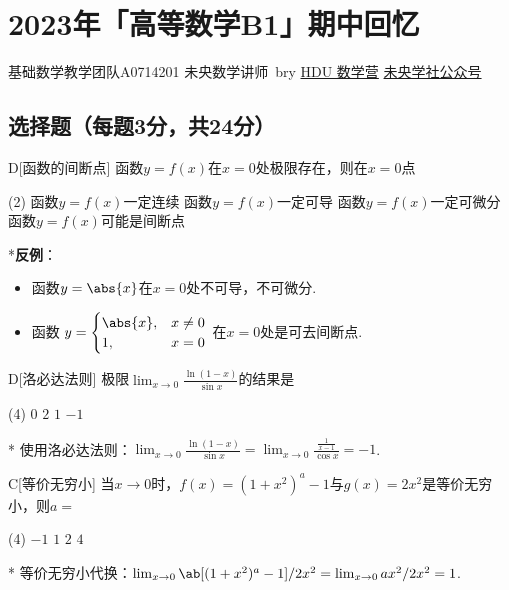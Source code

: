 \chapter{2023年「高等数学B1」期中回忆}
\date{2023年12月2日}{基础数学教学团队}{A0714201}
{未央数学讲师~bry}
{}{\href{https://qm.qq.com/q/OlkSiy9W04}{HDU 数学营}}
{}{\href{http://weixin.qq.com/r/mhKYgFTEMQlOrRDj90eI}{未央学社公众号}}

\section{选择题（每题3分，共24分）}
\begin{choice}{D}[函数的间断点]
    函数$y=f(x)$在$x=0$处极限存在，则在$x=0$点
\begin{tasks}(2)
    \task 函数$y=f(x)$一定连续
    \task 函数$y=f(x)$一定可导
    \task 函数$y=f(x)$一定可微分
    \task 函数$y=f(x)$可能是间断点
\end{tasks}
\end{choice}
\begin{solution}*\textbf{反例}：
\begin{itemize}
    \item 函数$y=\abs{x}$在$x=0$处不可导，不可微分.
    \item 函数
    $y=\begin{cases}
        \abs{x}, & x\neq 0\\
        1, & x=0
    \end{cases}$
    在$x=0$处是可去间断点.
\end{itemize}
\end{solution}

\begin{choice}{D}[洛必达法则]
    极限$\lim_{x\to 0}\frac{\ln(1-x)}{\sin x}$的结果是
\begin{tasks}(4)
    \task $0$
    \task $2$
    \task $1$
    \task $-1$
\end{tasks}
\end{choice}
\begin{solution}*
    使用洛必达法则：$\lim_{x\to 0}\tfrac{\ln(1-x)}{\sin x}=\lim_{x\to 0}\tfrac{\frac{1}{x-1}}{\cos x}=-1$.
\end{solution}

\begin{choice}{C}[等价无穷小]
    当$x\to 0$时，$f(x)=(1+x^2)^a-1$与$g(x)=2x^2$是等价无穷小，则$a=$
\begin{tasks}(4)
    \task $-1$
    \task $1$
    \task $2$
    \task $4$
\end{tasks}
\end{choice}
\begin{solution}*
    等价无穷小代换：$\lim_{x\to 0}\ab[(1+x^2)^a-1]/2x^2=\lim_{x\to 0}ax^2/2x^2=1$.
\end{solution}

